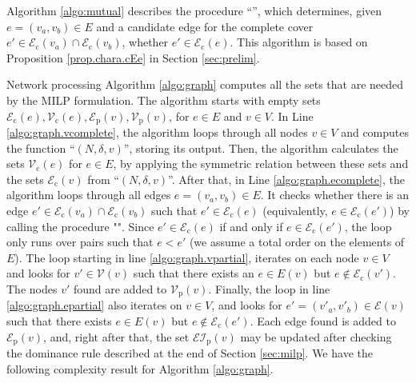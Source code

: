 \documentclass[review]{elsarticle}
\newcommand{\cE}{{\mathcal E}}
\newcommand{\cEI}{{\mathcal {EI}}}
\newcommand{\cV}{{\mathcal V}}
\newcommand{\dlt}{{\delta}}
\newcommand{\ncalgo}{\text{nodeCover}}
\newcommand{\malgo}{\text{mutual}}
\theoremstyle{definition}
\begin{document}
Algorithm \ref{algo:mutual} describes the procedure ``\malgo'', which determines, given $e=(v_a,v_b)\in E$ and a candidate edge for the complete cover $e'\in \cE_{\mathrm{c}}(v_a)\cap\cE_{\mathrm{c}}(v_b)$, whether $e' \in \cE_{\mathrm{c}}(e)$. This algorithm is based on Proposition \ref{prop.chara.cEe} in Section \ref{sec:prelim}.

Network processing Algorithm \ref{algo:graph} computes all the sets that are needed by the MILP formulation. The algorithm  starts with empty sets $\cE_{\mathrm{c}}(e), \cV_{\mathrm{c}}(e), \cE_{\mathrm{p}}(v), \cV_{\mathrm{p}}(v)$, for $e \in E$ and $v \in V$. In Line \ref{algo:graph.vcomplete}, the algorithm loops through all nodes  $v\in V$ and computes the function ``\ncalgo{}$(N,\dlt,v)$'', storing its output. Then, the algorithm calculates the sets $\cV_{\mathrm{c}}(e)$ for $e\in E$, by applying the symmetric relation between these sets and the sets $\cE_{\mathrm{c}}(v)$ from ``\ncalgo{}$(N,\dlt,v)$''. After that, in Line \ref{algo:graph.ecomplete}, the algorithm loops through all edges $e=(v_a,v_b) \in E$. It checks whether there is an edge $e' \in \cE_{\mathrm{c}}(v_a) \cap \cE_{\mathrm{c}}(v_b)$ such that $e' \in \cE_{\mathrm{c}}(e)$  (equivalently, $e \in \cE_{\mathrm{c}}(e')$) by calling the procedure "\malgo". Since $e' \in \cE_{\mathrm{c}}(e)$  if and only if $e \in \cE_{\mathrm{c}}(e')$, the loop only runs over pairs such that $e<e'$ (we assume a total order on the elements of $E$).  The loop starting in line \ref{algo:graph.vpartial}, iterates on each node $v \in V$ and looks for $v' \in \cV(v)$ such that there exists an $e \in E(v)$ but $e \notin \cE_{\mathrm{c}}(v')$. The nodes $v'$ found are added to $\cV_{\mathrm{p}}(v)$. Finally, the loop in line \ref{algo:graph.epartial} also iterates on $v\in V$, and looks for $e'=(v'_a,v'_b) \in \cE(v)$ such that there exists $e \in E(v)$ but $e \notin \cE_{\mathrm{c}}(e')$. Each edge found is added to $\cE_{\mathrm{p}}(v)$, and, right after that, the set $\cEI_{\mathrm{p}}(v)$ may be updated after checking the dominance rule described at the end of Section \ref{sec:milp}. We have the following complexity result for Algorithm \ref{algo:graph}.
\end{document}
